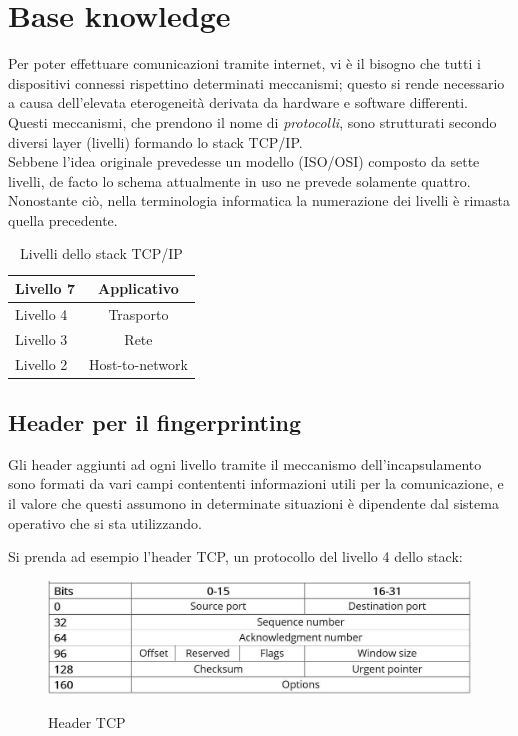 \chapter{Base knowledge}

Per poter effettuare comunicazioni tramite internet, vi è il bisogno che tutti i dispositivi connessi rispettino determinati meccanismi; questo si rende necessario a causa dell'elevata eterogeneità derivata da hardware e software differenti.
Questi meccanismi, che prendono il nome di \textit{protocolli}, sono strutturati secondo diversi layer (livelli) formando lo stack TCP/IP.  \\
Sebbene l'idea originale prevedesse un modello (ISO/OSI) composto da sette livelli, de facto lo schema attualmente in uso ne prevede solamente quattro. Nonostante ciò, nella terminologia informatica la numerazione dei livelli è rimasta quella precedente.
\\
\begin{table}[htb]
	\centering
	\begin{tabular}{| l | c |}
		\hline
		Livello 7 & Applicativo
		\\
		\hline
		Livello 4 & Trasporto
		\\
		\hline
		Livello 3 & Rete
		\\
		\hline
		Livello 2 & Host-to-network
		\\
		\hline
		
	\end{tabular}
	\caption{Livelli dello stack TCP/IP}
	\label{tab:stack}
\end{table}


\section{Header per il fingerprinting}
Gli header aggiunti ad ogni livello tramite il meccanismo dell'incapsulamento sono formati da vari campi contententi informazioni utili per la comunicazione, e il valore che questi assumono in determinate situazioni è dipendente dal sistema operativo che si sta utilizzando.

Si prenda ad esempio l'header TCP, un protocollo del livello 4 dello stack:\\

\begin{figure}[H]
	\centering
	\includegraphics[width=\textwidth]{figures/headerTCP.JPG}
	\caption{Header TCP}
	\label{headerTCP}
	\cite{headerTCP}
\end{figure}

